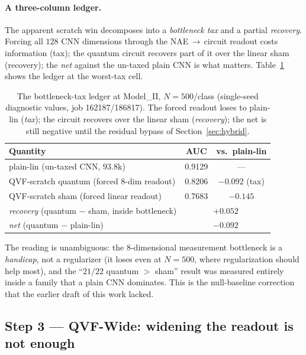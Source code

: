 \documentclass[10pt,letterpaper]{article}
\theoremstyle{plain}
\theoremstyle{definition}
\newcommand{\lose}[1]{\textcolor{bad}{#1}}
\begin{document}
\paragraph{A three-column ledger.}
The apparent scratch win decomposes into a \emph{bottleneck tax} and a partial
\emph{recovery}. Forcing all $128$ CNN dimensions through the NAE$\,\to\,$circuit
readout costs information (tax); the quantum circuit recovers part of it over the
linear sham (recovery); the \emph{net} against the un-taxed plain CNN is what
matters. Table~\ref{tab:ledger} shows the ledger at the worst-tax cell.

\begin{table}[h!]
\centering
\caption{The bottleneck-tax ledger at Model\_II, $N{=}500$/class
(single-seed diagnostic values, job 162187/186817). The forced readout loses to
plain-lin (\emph{tax}); the circuit recovers over the linear sham
(\emph{recovery}); the net is still negative until the residual bypass of
Section~\ref{sec:hybrid}.}
\label{tab:ledger}
\begin{tabular}{@{}lcc@{}}
\toprule
Quantity & AUC & vs.\ plain-lin \\
\midrule
plain-lin (un-taxed CNN, $93.8$k) & 0.9129 & --- \\
QVF-scratch quantum (forced $8$-dim readout) & 0.8206 & \lose{$-0.092$} (tax) \\
QVF-scratch sham (forced linear readout) & 0.7683 & \lose{$-0.145$} \\
\midrule
\emph{recovery} (quantum $-$ sham, inside bottleneck) & \multicolumn{2}{c}{$+0.052$} \\
\emph{net} (quantum $-$ plain-lin) & \multicolumn{2}{c}{\lose{$-0.092$}} \\
\bottomrule
\end{tabular}
\end{table}

The reading is unambiguous: the $8$-dimensional measurement bottleneck is a
\emph{handicap}, not a regularizer (it loses even at $N{=}500$, where
regularization should help most), and the ``$21/22$ quantum $>$ sham'' result was
measured entirely inside a family that a plain CNN dominates. This is the
null-baseline correction that the earlier draft of this work lacked.

\subsection{Step 3 --- QVF-Wide: widening the readout is not enough}
\label{sec:wide}
\end{document}
